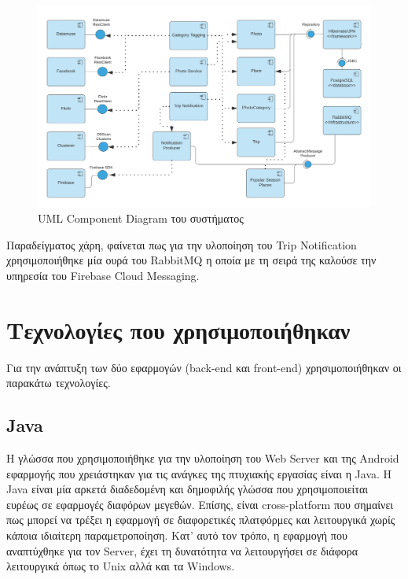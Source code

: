 \documentclass[oneside, 12pt]{book}
\begin{document}
\begin{figure}[h]
  \centering
  \includegraphics[scale=0.15]{images/uml_component_diagram.png}
  \caption{\label{fig:uml_component_diagram}UML Component Diagram του συστήματος}
\end{figure}

Παραδείγματος χάρη, φαίνεται πως για την υλοποίηση του Trip Notification χρησιμοποιήθηκε μία ουρά του RabbitMQ η οποία με τη σειρά της καλούσε την υπηρεσία του Firebase Cloud Messaging.

\section{Τεχνολογίες που χρησιμοποιήθηκαν}
Για την ανάπτυξη των δύο εφαρμογών (back-end και front-end) 
χρησιμοποιήθηκαν οι παρακάτω τεχνολογίες.

\subsection{Java} 
Η γλώσσα που χρησιμοποιήθηκε για την υλοποίηση του 
Web Server και της Android εφαρμογής που χρειάστηκαν για τις ανάγκες 
της πτυχιακής εργασίας είναι η Java. Η Java είναι μία 
αρκετά διαδεδομένη και δημοφιλής γλώσσα που χρησιμοποιείται ευρέως σε 
εφαρμογές διαφόρων μεγεθών. Επίσης, είναι cross-platform που σημαίνει 
πως μπορεί να τρέξει η εφαρμογή σε διαφορετικές πλατφόρμες και 
λειτουργικά χωρίς κάποια ιδιαίτερη παραμετροποίηση. Κατ' αυτό τον τρόπο, η εφαρμογή που αναπτύχθηκε για τον Server, έχει τη δυνατότητα να λειτουργήσει σε διάφορα λειτουργικά όπως το Unix αλλά και τα Windows.
\end{document}
